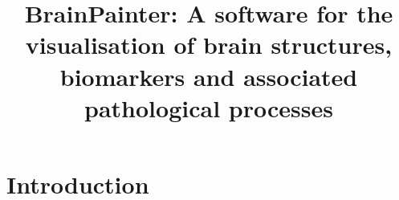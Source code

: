 \documentclass[10pt,xcolor=table,aspectratio=169]{beamer}
\title{BrainPainter: A software for the visualisation of brain structures, biomarkers and associated pathological processes}
\author[Raz]{\footnotesize{R\u{a}zvan V. Marinescu\inst{1,2} \and Arman Eshaghi\inst{2} \and Daniel C. Alexander\inst{2} \and Polina Golland\inst{1}}}
\institute{
1. Computer Science and Artificial Intelligence Laboratory, MIT, Cambridge, USA\\
2. Centre for Medical Image Computing, UCL, London, UK\\
3. Queen Square MS Centre, UCL Institute of Neurology, London, UK\\
}
\date{}
\begin{document}
 
\section{Introduction}

 \frame{\titlepage}
 

\newcommand{\upgradeReportLoc}{../../upgrade_report}
\newcommand{\epsrcPresLoc}{\upgradeReportLoc/epsrcPres}
\newcommand{\jointModellingDiseaseLoc}{../../jointModellingDisease}
\newcommand{\pcaLongPaperLoc}{../../PCA_long_paper}
\newcommand{\voxFld}{../../voxelwiseDPM}
\newcommand{\tadpoleFld}{/research/tadpole}
\newcommand{\diffEqModelFld}{../../diffEqModel}



\newcommand*{\pcaLongFigs}{\pcaLongPaperLoc/figures}





\newcommand{\ovHeight}{2cm}
\end{document}
